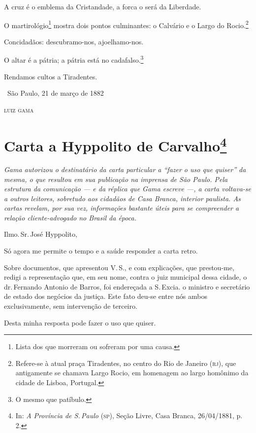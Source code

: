 A cruz é o emblema da Cristandade, a forca o será da Liberdade.

O martirológio\footnote{Lista dos que morreram ou sofreram por uma
  causa.} mostra dois pontos culminantes: o Calvário e o Largo do
Rocio.\footnote{Refere-se à atual praça Tiradentes, no centro do Rio
  de Janeiro (\textsc{rj}), que antigamente se chamava Largo Rocio, em
  homenagem ao largo homônimo da cidade de Lisboa, Portugal.}

Concidadãos: descubramo-nos, ajoelhamo-nos.

O altar é a pátria; a pátria está no cadafalso.\footnote{O mesmo que
  patíbulo.}

Rendamos cultos a Tiradentes.

\medskip

\hfill\ São Paulo, 21 de março de 1882

\hfill\textsc{luiz gama}

\chapter{Carta a Hyppolito de Carvalho\footnote{In: \emph{A
  Província de S.\,Paulo} (\textsc{sp}), Seção Livre, Casa Branca, 26/04/1881, p.
  2.}}

\begin{resumo}
\emph{Gama autorizou o destinatário da carta particular a ``fazer o uso que quiser''
da mesma, o que resultou em sua publicação na
imprensa de São Paulo. Pela estrutura da comunicação --- e da réplica que
Gama escreve ---, a carta voltava-se a outros
leitores, sobretudo aos cidadãos de Casa Branca, interior paulista. As
cartas revelam, por sua vez, informações bastante úteis para se
compreender a relação cliente-advogado no Brasil da época.}
\end{resumo}

Ilmo.\,Sr.\,José Hyppolito,

Só agora me permite o tempo e a saúde responder a carta retro.

Sobre documentos, que
apresentou V.\,S., e com explicações, que prestou-me, redigi a
representação que, em seu nome, contra o juiz municipal dessa cidade, o
dr.\,Fernando Antonio de Barros, foi endereçada a S.\,Excia. o ministro e
secretário de estado dos negócios da justiça. Este fato deu-se entre nós
ambos exclusivamente, sem intervenção de terceiro.

Desta minha resposta pode fazer o uso que quiser.

